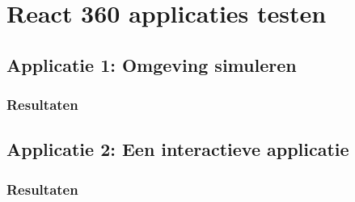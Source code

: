 \chapter{React 360 applicaties testen}
\label{ch:react-360-apps}

\section{Applicatie 1: Omgeving simuleren}
\label{sec:omgeving-simulatie}

\subsection{Resultaten}
\label{sec:resulaten-app1}

\section{Applicatie 2: Een interactieve applicatie}
\label{sec:interactieve-applicatie}

\subsection{Resultaten}
\label{sec:resulaten-app2}